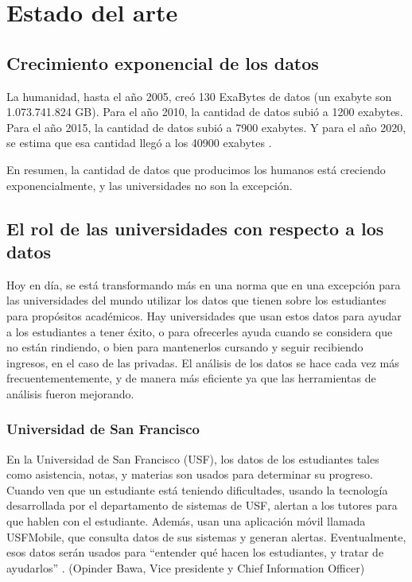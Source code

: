 \chapter{Estado del arte}
\label{sec:hello}

\section[Crecimiento exponencial de los datos]{Crecimiento exponencial de los datos} 


La humanidad, hasta el año 2005, creó 130 ExaBytes de datos (un exabyte son 1.073.741.824 GB). Para el año 2010, la cantidad de datos subió a 1200 exabytes. Para el año 2015, la cantidad de datos subió a 7900 exabytes. Y para el año 2020, se estima que esa cantidad llegó a los 40900 exabytes \cite{IDC}.

En resumen, la cantidad de datos que producimos los humanos está creciendo exponencialmente, y las universidades no son la excepción.



\section[El rol de las universidades con respecto a los datos]{El rol de las universidades con respecto a los datos}

Hoy en día, se está transformando más en una norma que en una excepción para las universidades del mundo utilizar los datos que tienen sobre los estudiantes para propósitos académicos. Hay universidades que usan estos datos para ayudar a los estudiantes a tener éxito, o para ofrecerles ayuda cuando se considera que no están rindiendo, o bien para mantenerlos cursando y seguir recibiendo ingresos, en el caso de las privadas.
El análisis de los datos se hace cada vez más frecuentementemente, y de manera más eficiente ya que las herramientas de análisis fueron mejorando.

\subsection[Universidad de San Francisco]{Universidad de San Francisco}

En la Universidad de San Francisco (USF), los datos de los estudiantes tales como asistencia, notas, y materias son usados para determinar su progreso. Cuando ven que un estudiante está teniendo dificultades, usando la tecnología desarrollada por el departamento de sistemas de USF, alertan a los tutores para que hablen con el estudiante.
Además, usan una aplicación móvil llamada USFMobile, que consulta datos de sus sistemas y generan alertas.
Eventualmente, esos datos serán usados para “entender qué hacen los estudiantes, y tratar de ayudarlos” . (Opinder Bawa, Vice presidente y Chief Information Officer)

